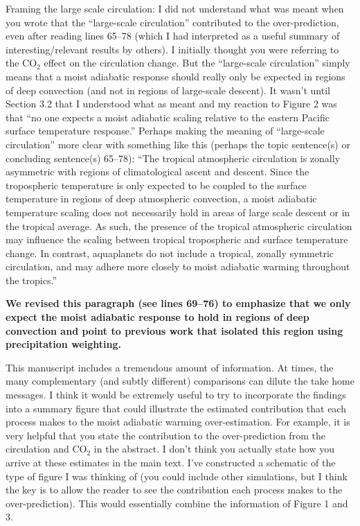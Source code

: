 \documentclass[11pt]{article}
\begin{document}
Framing the large scale circulation: I did not understand what was meant when you wrote that the ``large-scale circulation'' contributed to the over-prediction, even after reading lines 65--78 (which I had interpreted as a useful summary of interesting/relevant results by others). I initially thought you were referring to the CO\(_2\) effect on the circulation change. But the ``large-scale circulation'' simply means that a moist adiabatic response should really only be expected in regions of deep convection (and not in regions of large-scale descent). It wasn't until Section 3.2 that I understood what as meant and my reaction to Figure 2 was that ``no one expects a moist adiabatic scaling relative to the eastern Pacific surface temperature response.'' Perhaps making the meaning of ``large-scale circulation'' more clear with something like this (perhaps the topic sentence(s) or concluding sentence(s) 65--78): ``The tropical atmospheric circulation is zonally asymmetric with regions of climatological ascent and descent. Since the tropospheric temperature is only expected to be coupled to the surface temperature in regions of deep atmospheric convection, a moist adiabatic temperature scaling does not necessarily hold in areas of large scale descent or in the tropical average. As such, the presence of the tropical atmospheric circulation may influence the scaling between tropical tropospheric and surface temperature change. In contrast, aquaplanets do not include a tropical, zonally symmetric circulation, and may adhere more closely to moist adiabatic warming throughout the tropics.''

\textbf{We revised this paragraph (see lines 69--76) to emphasize that we only expect the moist adiabatic response to hold in regions of deep convection and point to previous work that isolated this region using precipitation weighting.}

This manuscript includes a tremendous amount of information. At times, the many complementary (and subtly different) comparisons can dilute the take home messages. I think it would be extremely useful to try to incorporate the findings into a summary figure that could illustrate the estimated contribution that each process makes to the moist adiabatic warming over-estimation. For example, it is very helpful that you state the contribution to the over-prediction from the circulation and CO\(_2\) in the abstract. I don't think you actually state how you arrive at these estimates in the main text. I've constructed a schematic of the type of figure I was thinking of (you could include other simulations, but I think the key is to allow the reader to see the contribution each process makes to the over-prediction). This would essentially combine the information of Figure 1 and 3.
\end{document}
